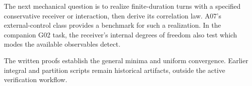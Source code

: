 \documentclass[11pt,a4paper]{article}
\begin{document}
The next mechanical question is to realize finite-duration turns with a
specified conservative receiver or interaction, then derive its
correlation law. A07's external-control class provides a benchmark for
such a realization. In the companion G02 task, the receiver's internal
degrees of freedom also test which modes the available observables
detect.

The written proofs establish the general minima and uniform convergence.
Earlier integral and partition scripts remain historical artifacts,
outside the active verification workflow.
\end{document}
